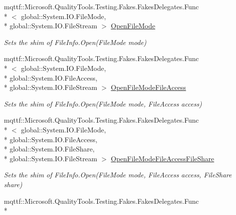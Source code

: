 \begin{DoxyCompactItemize}
mqttf\-::\-Microsoft.\-Quality\-Tools.\-Testing.\-Fakes.\-Fakes\-Delegates.\-Func\\*
$<$ global\-::\-System.\-I\-O.\-File\-Mode, \\*
global\-::\-System.\-I\-O.\-File\-Stream $>$ \hyperlink{class_system_1_1_i_o_1_1_fakes_1_1_shim_file_info_ab3b38a4384078912f9430a08eba40b26}{Open\-File\-Mode}
\begin{DoxyCompactList}\small\item\em Sets the shim of File\-Info.\-Open(\-File\-Mode mode)\end{DoxyCompactList}\item 
mqttf\-::\-Microsoft.\-Quality\-Tools.\-Testing.\-Fakes.\-Fakes\-Delegates.\-Func\\*
$<$ global\-::\-System.\-I\-O.\-File\-Mode, \\*
global\-::\-System.\-I\-O.\-File\-Access, \\*
global\-::\-System.\-I\-O.\-File\-Stream $>$ \hyperlink{class_system_1_1_i_o_1_1_fakes_1_1_shim_file_info_a2127ecf29bb2f3e1d4bf777bb22c3060}{Open\-File\-Mode\-File\-Access}
\begin{DoxyCompactList}\small\item\em Sets the shim of File\-Info.\-Open(\-File\-Mode mode, File\-Access access)\end{DoxyCompactList}\item 
mqttf\-::\-Microsoft.\-Quality\-Tools.\-Testing.\-Fakes.\-Fakes\-Delegates.\-Func\\*
$<$ global\-::\-System.\-I\-O.\-File\-Mode, \\*
global\-::\-System.\-I\-O.\-File\-Access, \\*
global\-::\-System.\-I\-O.\-File\-Share, \\*
global\-::\-System.\-I\-O.\-File\-Stream $>$ \hyperlink{class_system_1_1_i_o_1_1_fakes_1_1_shim_file_info_a1355583744570cfd191495cf2a66868f}{Open\-File\-Mode\-File\-Access\-File\-Share}
\begin{DoxyCompactList}\small\item\em Sets the shim of File\-Info.\-Open(\-File\-Mode mode, File\-Access access, File\-Share share)\end{DoxyCompactList}\item 
mqttf\-::\-Microsoft.\-Quality\-Tools.\-Testing.\-Fakes.\-Fakes\-Delegates.\-Func\\*

\end{DoxyCompactItemize}
